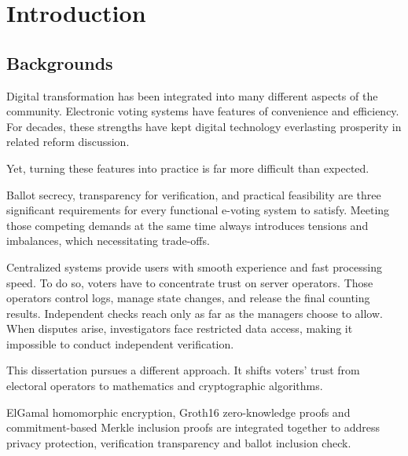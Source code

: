 \chapter{Introduction}
\begingroup
\justifying
\setlength{\parindent}{0pt}
\setlength{\parskip}{0.5\baselineskip}
\titlespacing{\chapter}{0pt}{0pt}{0pt}
\titlespacing{\section}{0pt}{0pt}{0pt}

\section{Backgrounds}

Digital transformation has been integrated into many different aspects of the community. Electronic voting systems have features of convenience and efficiency. For decades, these strengths have kept digital technology everlasting prosperity in related reform discussion.

Yet, turning these features into practice is far more difficult than expected.

Ballot secrecy, transparency for verification, and practical feasibility are three significant requirements for every functional e-voting system to satisfy. Meeting those competing demands at the same time always introduces tensions and imbalances, which necessitating trade-offs.

Centralized systems provide users with smooth experience and fast processing speed. To do so, voters have to concentrate trust on server operators. Those operators control logs, manage state changes, and release the final counting results. Independent checks reach only as far as the managers choose to allow. When disputes arise, investigators face restricted data access, making it impossible to conduct independent verification.

This dissertation pursues a different approach. It shifts voters' trust from electoral operators to mathematics and cryptographic algorithms.

ElGamal homomorphic encryption, Groth16 zero-knowledge proofs and commitment-based Merkle inclusion proofs are integrated together to address privacy protection, verification transparency and ballot inclusion check.

